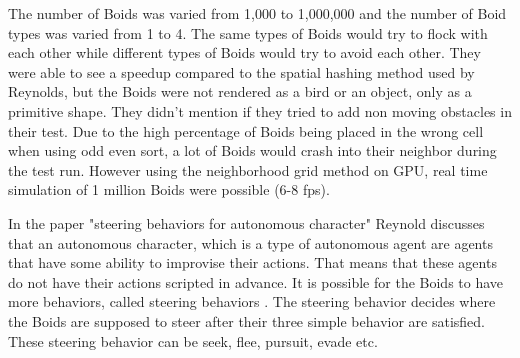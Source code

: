 The number of Boids was varied from 1,000 to 1,000,000 and the number of Boid types was varied from 1 to 4. The same types of Boids would try to flock with each other while different types of Boids would try to avoid each other.
They were able to see a speedup compared to the spatial hashing method used by Reynolds, but the Boids were not rendered as a bird or an object, only as a primitive shape. They didn't mention if they tried to add non moving obstacles in their test. Due to the high percentage of Boids being placed in the wrong cell when using odd even sort, a lot of Boids would crash into their neighbor during the test run. However using the neighborhood grid method on GPU, real time simulation of 1 million Boids were possible (6-8 fps).

In the paper "steering behaviors for autonomous character" Reynold discusses that an autonomous character, which is a type of autonomous agent are agents that have some ability to improvise their actions. That means that these agents do not have their actions scripted in advance.
It is possible for the Boids to have more behaviors, called steering behaviors \cite{Reynolds1999}. The steering behavior decides where the Boids are supposed to steer after their three simple behavior are satisfied.  These steering behavior can be seek, flee, pursuit, evade etc. 

